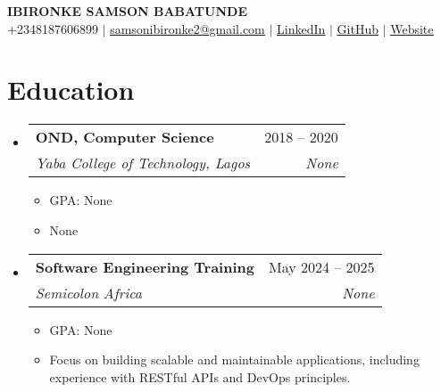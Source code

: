 \documentclass[letterpaper,11pt]{article}
\makeatletter
\newcommand{\resumeItem}[1]{
  \item\small{
    {#1 \vspace{-2pt}}
  }
}
\newcommand{\resumeSubheading}[4]{
  \vspace{-2pt}\item
    \begin{tabular*}{0.97\textwidth}[t]{l@{\extracolsep{\fill}}r}
      \textbf{#1} & #2 \\
      \textit{\small#3} & \textit{\small #4} \\
    \end{tabular*}\vspace{-7pt}
}
\newcommand{\resumeSubHeadingListStart}{\begin{itemize}[leftmargin=0.15in, label={}]}
\newcommand{\resumeSubHeadingListEnd}{\end{itemize}}
\newcommand{\resumeItemListStart}{\begin{itemize}}
\newcommand{\resumeItemListEnd}{\end{itemize}\vspace{-5pt}}
\makeatother
\begin{document}
\begin{center}
    \textbf{\Huge \scshape IBIRONKE SAMSON BABATUNDE} \\ \vspace{1pt}
    \small +2348187606899 $|$ \href{mailto:samsonibironke2@gmail.com}{\underline{samsonibironke2@gmail.com}} $|$ \href{https://None}{\underline{LinkedIn}} $|$ \href{https://None}{\underline{GitHub}} $|$ \href{https://None}{\underline{Website}}
\end{center}

\section{Education}
  \resumeSubHeadingListStart
    \resumeSubheading
      {OND, Computer Science}{2018 -- 2020}
      {Yaba College of Technology, Lagos}{None}
      \resumeItemListStart
        \resumeItem{GPA: None}
        \resumeItem{None}
      \resumeItemListEnd
    \resumeSubheading
      {Software Engineering Training}{May 2024 -- 2025}
      {Semicolon Africa}{None}
      \resumeItemListStart
        \resumeItem{GPA: None}
        \resumeItem{Focus on building scalable and maintainable applications, including experience with RESTful APIs and DevOps principles.}
      \resumeItemListEnd
  \resumeSubHeadingListEnd

\end{document}
